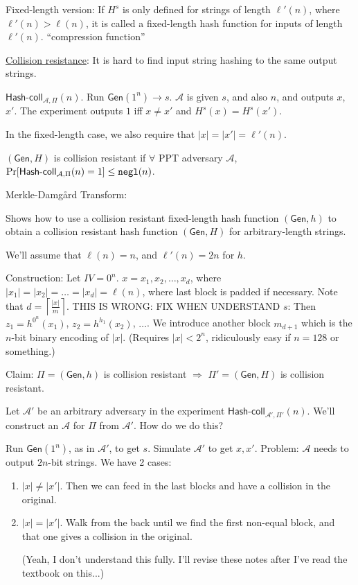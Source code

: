 \documentclass[12pt]{article}
\newcommand{\AAA}{\mathcal{A}}
\newcommand{\Gen}{\mathsf{Gen}}
\newcommand{\ExptHCArgs}[2]{\mathsf{Hash\text{-}coll}_{#1,#2}}
\newcommand{\ExptHC}{\ExptHCArgs{\AAA}{\Pi}}
\newcommand{\negl}{{\tt negl}}
\begin{document}
Fixed-length version: If $H^s$ is only defined for strings of length $\ell'(n)$, where $\ell'(n)>\ell(n)$, it is called a fixed-length hash function for inputs of length $\ell'(n)$. ``compression function''

\underline{Collision resistance}: It is hard to find input string hashing to the same output strings.

$\ExptHC(n)$. Run $\Gen(1^n)\to s$. $\AAA$ is given $s$, and also $n$, and outputs $x$, $x'$. The experiment outputs $1$ iff $x\neq x'$ and $H^s(x)=H^s(x')$.

In the fixed-length case, we also require that $|x|=|x'|=\ell'(n)$.

$(\Gen,H)$ is collision resistant if $\forall$ PPT adversary $\AAA$, $\Pr[\ExptHC(n)=1]\leq\negl(n)$.

Merkle-Damg\r{a}rd Transform:

Shows how to use a collision resistant fixed-length hash function $(\Gen,h)$ to obtain a collision resistant hash function $(\Gen,H)$ for arbitrary-length strings.

We'll assume that $\ell(n)=n$, and $\ell'(n)=2n$ for $h$.

Construction: Let $IV=0^n$. $x=x_1,x_2,\dots,x_d$, where $|x_1|=|x_2|=\dots=|x_d|=\ell(n)$, where last block is padded if necessary. Note that $d=\left\lceil\frac{|x|}{m}\right\rceil$. THIS IS WRONG: FIX WHEN UNDERSTAND $s$: Then $z_1=h^{0^n}(x_1)$, $z_2=h^{h_1}(x_2)$, $\dots$. We introduce another block $m_{d+1}$ which is the $n$-bit binary encoding of $|x|$. (Requires $|x|<2^n$, ridiculously easy if $n=128$ or something.)

Claim: $\Pi=(\Gen,h)$ is collision resistant $\Rightarrow$ $\Pi'=(\Gen,H)$ is collision resistant.

Let $\AAA'$ be an arbitrary adversary in the experiment $\ExptHCArgs{\AAA'}{\Pi'}(n)$. We'll construct an $\AAA$ for $\Pi$ from $\AAA'$. How do we do this?

Run $\Gen(1^n)$, as in $\AAA'$, to get $s$. Simulate $\AAA'$ to get $x,x'$. Problem: $\AAA$ needs to output $2n$-bit strings. We have 2 cases:\begin{enumerate}

\item $|x|\neq|x'|$. Then we can feed in the last blocks and have a collision in the original.

\item $|x|=|x'|$. Walk from the back until we find the first non-equal block, and that one gives a collision in the original.

(Yeah, I don't understand this fully. I'll revise these notes after I've read the textbook on this...)

\end{enumerate}
\end{document}
